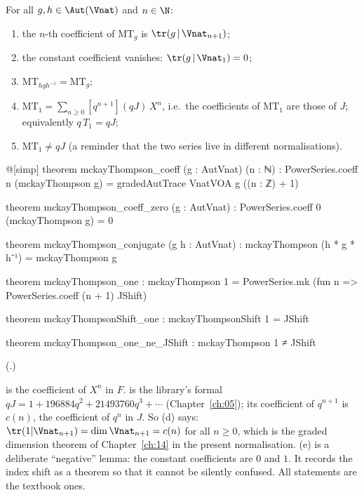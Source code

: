 \begin{proposition}\label{ch16:prop:mtprops}
For all $g,h\in\Aut(\Vnat)$ and $n\in\N$:
\begin{enumerate}[label=(\alph*)]
\item the $n$-th coefficient of $\mathrm{MT}_g$ is $\tr(g\,|\,\Vnat_{n+1})$;
\item the constant coefficient vanishes: $\tr(g\,|\,\Vnat_1)=0$;
\item $\mathrm{MT}_{hgh^{-1}}=\mathrm{MT}_g$;
\item $\mathrm{MT}_1=\sum_{n\ge0}[q^{n+1}](qJ)\,X^n$, i.e.\ the coefficients of $\mathrm{MT}_1$ are those of $J$;
  equivalently $q\,T_1=qJ$;
\item $\mathrm{MT}_1\ne qJ$ (a reminder that the two series live in different normalisations).
\end{enumerate}
\end{proposition}
\begin{leancode}
@[simp] theorem mckayThompson_coeff (g : AutVnat) (n : ℕ) :
    PowerSeries.coeff n (mckayThompson g) =
      gradedAutTrace VnatVOA g ((n : ℤ) + 1)

theorem mckayThompson_coeff_zero (g : AutVnat) :
    PowerSeries.coeff 0 (mckayThompson g) = 0

theorem mckayThompson_conjugate (g h : AutVnat) :
    mckayThompson (h * g * h⁻¹) = mckayThompson g

theorem mckayThompson_one :
    mckayThompson 1 = PowerSeries.mk (fun n => PowerSeries.coeff (n + 1) JShift)

theorem mckayThompsonShift_one : mckayThompsonShift 1 = JShift

theorem mckayThompson_one_ne_JShift : mckayThompson 1 ≠ JShift
\end{leancode}
(.)
\begin{dictionary}
 is the coefficient of $X^n$ in $F$.   is the library's formal
$qJ=1+196884q^2+21493760q^3+\cdots$ (Chapter~\ref{ch:05}); its coefficient of $q^{n+1}$ is $c(n)$, the coefficient
of $q^n$ in $J$.  So (d) says: $\tr(1|\Vnat_{n+1})=\dim\Vnat_{n+1}=c(n)$ for all $n\ge0$, which is the graded
dimension theorem of Chapter~\ref{ch:14} in the present normalisation.  (e) is a deliberate ``negative'' lemma: the
constant coefficients are $0$ and $1$.  It records the index shift as a theorem so that it cannot be silently
confused.  All statements are the textbook ones.
\end{dictionary}
